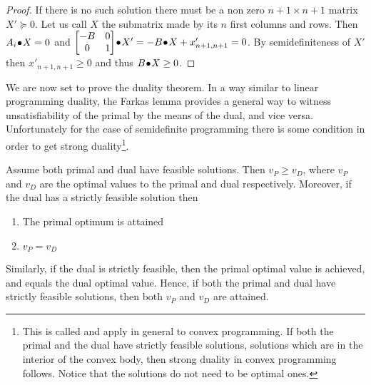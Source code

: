 \documentclass[a4paper,twoside,justified]{tufte-handout}
\begin{document}
\begin{proof}
  If there is no such solution there must be a non zero $ n+1 \times
  n+1 $ matrix $ X'\succeq 0 $. Let us call $X$ the submatrix made by
  its $ n $ first columns and rows. Then $ {A_{i}}\!\bullet\!{X}
  =0$ and $ {\begin{bmatrix} -B & 0\\ 0 &
      1\end{bmatrix}}\!\bullet\!{X'} = -{B}\!\bullet\!{X}+x'_{n+1,n+1} = 0
  $. By semidefiniteness of $ X'$ then $ x'_{n+1,n+1}\geq 0$ and thus
  $ {B}\!\bullet\!{X}\geq 0 $.
\end{proof}

We are now set to prove the duality theorem. In a way similar to
linear programming duality, the Farkas lemma provides a general way to
witness unsatisfiability of the primal by the means of the dual, and
vice versa. Unfortunately for the case of semidefinite programming
there is some condition in order to get strong duality\footnote{This
  is called  and apply in general to
  convex programming. If both the primal and the dual have strictly
  feasible solutions, \ie solutions which are in the interior of the
  convex body, then strong duality in convex programming
  follows. Notice that the solutions do not need to be optimal
  ones.}.


\begin{theorem}\label{thm:strongduality}
  Assume both primal and dual have feasible solutions. Then $v_{P}
  \geq v_{D}$, where $v_{P}$ and $ v_{D} $ are the optimal values to
  the primal and dual respectively. Moreover, if the dual has a
  strictly feasible solution then
  \begin{enumerate}
    \item The primal optimum is attained
    \item $ v_{P} = v_{D}$ 
  \end{enumerate}
  Similarly, if the dual is strictly feasible, then the primal optimal
  value is achieved, and equals the dual optimal value. Hence, if both
  the primal and dual have strictly feasible solutions, then both
  $v_{P}$ and $v_{D}$ are attained.
\end{theorem}
\end{document}
